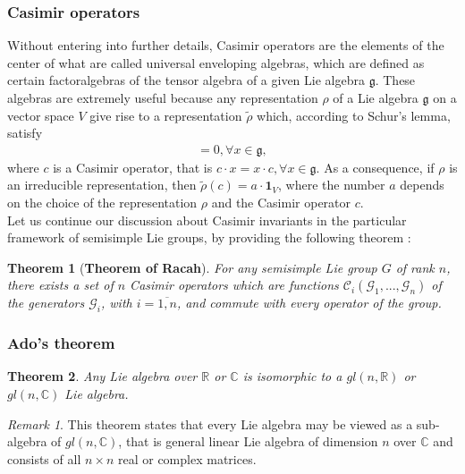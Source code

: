 \documentclass[12pt,a4paper]{report}
\newtheorem{theorem}{Theorem}
\theoremstyle{definition}
\theoremstyle{remark}
\newtheorem*{remark}{Remark}
\theoremstyle{remark}
\begin{document}
\subsubsection{Casimir operators}
Without entering into further details, Casimir operators are the elements of the center of what are called universal enveloping algebras, which are defined as certain factoralgebras of the tensor algebra of a given Lie algebra $\mathfrak{g}$. These algebras are extremely useful because any representation $\rho$ of a Lie algebra $\mathfrak{g}$ on a vector space $V$ give rise to a representation $\widetilde{\rho}$ which, according to Schur's lemma, satisfy
\begin{align*}
[\widetilde{\rho}(c),\rho(x)]=0,\forall x\in\mathfrak{g},
\end{align*}
where $c$ is a Casimir operator, that is $c\cdot x=x\cdot c, \forall x\in\mathfrak{g}$.
As a consequence, if $\rho$ is an irreducible representation, then $\widetilde{\rho}(c)=a\cdot\mathbf{1}_V$, where the number $a$ depends on the choice of the representation $\rho$ and the Casimir operator $c$. \\ \indent
Let us continue our discussion about Casimir invariants in the particular framework of semisimple Lie groups, by providing the following theorem \cite{greiner}:
\begin{theorem}[\textbf{Theorem of Racah}]
For any semisimple Lie group $G$ of rank $n$, there exists a set of $n$ Casimir operators which are functions $\mathcal{C}_i(\mathcal{G}_1,...,\mathcal{G}_n)$ of the generators $\mathcal{G}_i$, with $i=\overline{1,n}$, and commute with every operator of the group.
\end{theorem}

\subsubsection{Ado's theorem}
\begin{theorem}\label{thado}
Any Lie algebra over $\mathbb{R}$ or $\mathbb{C}$ is isomorphic to a $gl(n,\mathbb{R})$ or $gl(n,\mathbb{C})$ Lie algebra. 
\end{theorem}
\begin{remark}This theorem states that every Lie algebra may be viewed as a sub-algebra of $gl(n,\mathbb{C})$, that is general linear Lie algebra of dimension $n$ over $\mathbb{C}$ and consists of all $n\times n$ real or complex matrices.
\end{remark}
\end{document}
